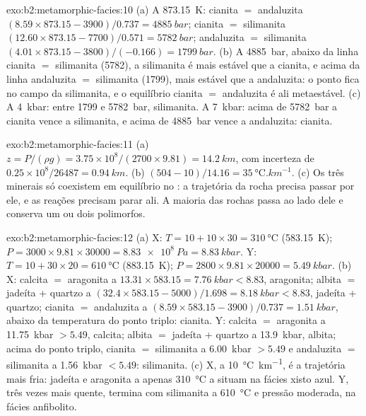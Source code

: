 \begin{solution}{exo:b2:metamorphic-facies:10}
(a) A \qty{873.15}{K}: cianita $=$ andaluzita $(8.59\times873.15 - 3900)/0.737 =
\qty{4885}{bar}$; cianita $=$ silimanita $(12.60\times873.15 - 7700)/0.571 =
\qty{5782}{bar}$; andaluzita $=$ silimanita $(4.01\times873.15 - 3800)/(-0.166) =
\qty{1799}{bar}$. (b) A \qty{4885}{bar}, abaixo da linha cianita $=$ silimanita (5782),
a silimanita é mais estável que a cianita, e acima da linha andaluzita $=$ silimanita
(1799), mais estável que a andaluzita: o ponto fica no campo da silimanita, e o
equilíbrio cianita $=$ andaluzita é ali metaestável. (c) A \qty{4}{kbar}: entre 1799
e \qty{5782}{bar}, silimanita. A \qty{7}{kbar}: acima de \qty{5782}{bar} a cianita vence a
silimanita, e acima de \qty{4885}{bar} vence a andaluzita: cianita.
\end{solution}

\begin{solution}{exo:b2:metamorphic-facies:11}
(a) $z = P/(\rho g) = 3.75\times10^8/(2700\times9.81) = \qty{14.2}{km}$, com incerteza de
$0.25\times10^8/26487 = \qty{0.94}{km}$. (b) $(504 - 10)/14.16 =
\qty{35}{\celsius.km^{-1}}$. (c) Os três minerais só coexistem em equilíbrio no
: a trajetória da rocha precisa passar por ele, e as reações precisam
parar ali. A maioria das rochas passa ao lado dele e conserva um ou dois polimorfos.
\end{solution}

\begin{solution}{exo:b2:metamorphic-facies:12}
(a) X: $T = 10 + 10\times30 = \qty{310}{\celsius}$ (\qty{583.15}{K}); $P = 3000\times
9.81\times30000 = \qty{8.83e8}{Pa} = \qty{8.83}{kbar}$. Y: $T = 10 + 30\times20 =
\qty{610}{\celsius}$ (\qty{883.15}{K}); $P = 2800\times9.81\times20000 = \qty{5.49}{kbar}$.
(b) X: calcita $=$ aragonita a $13.31\times583.15 = \qty{7.76}{kbar} < 8.83$, aragonita;
albita $=$ jadeíta + quartzo a $(32.4\times583.15 - 5000)/1.698 = \qty{8.18}{kbar} <
8.83$, jadeíta + quartzo; cianita $=$ andaluzita a $(8.59\times583.15 - 3900)/0.737 =
\qty{1.51}{kbar}$, abaixo da temperatura do ponto triplo: cianita. Y: calcita $=$
aragonita a \qty{11.75}{kbar} $> 5.49$, calcita; albita $=$ jadeíta + quartzo a
\qty{13.9}{kbar}, albita; acima do ponto triplo, cianita $=$ silimanita a
\qty{6.00}{kbar} $> 5.49$ e andaluzita $=$ silimanita a \qty{1.56}{kbar} $< 5.49$:
silimanita. (c) X, a \qty{10}{\celsius\per\km}, é a trajetória mais fria: jadeíta e
aragonita a apenas \qty{310}{\celsius} a situam na fácies xisto azul. Y, três vezes
mais quente, termina com silimanita a \qty{610}{\celsius} e pressão moderada, na
fácies anfibolito.
\end{solution}

